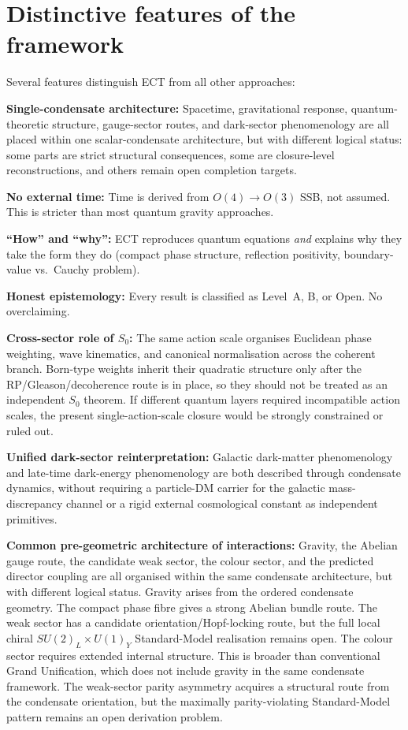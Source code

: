 \documentclass[11pt,a4paper]{article}
\begin{document}
\section{Distinctive features of the framework}

Several features distinguish ECT from all other approaches:

\textbf{Single-condensate architecture:} Spacetime, gravitational response, quantum-theoretic structure, gauge-sector routes, and dark-sector phenomenology are all placed within one scalar-condensate architecture, but with different logical status: some parts are strict structural consequences, some are closure-level reconstructions, and others remain open completion targets.

\textbf{No external time:} Time is derived from $O(4) \to O(3)$ SSB, not assumed. This is stricter than most quantum gravity approaches.

\textbf{``How'' and ``why'':} ECT reproduces quantum equations \emph{and} explains why they take the form they do (compact phase structure, reflection positivity, boundary-value vs.\ Cauchy problem).

\textbf{Honest epistemology:} Every result is classified as Level~A, B, or Open. No overclaiming.

\textbf{Cross-sector role of $S_0$:} The same action scale organises Euclidean phase weighting, wave kinematics, and canonical normalisation across the coherent branch. Born-type weights inherit their quadratic structure only after the RP/Gleason/decoherence route is in place, so they should not be treated as an independent $S_0$ theorem. If different quantum layers required incompatible action scales, the present single-action-scale closure would be strongly constrained or ruled out.

\textbf{Unified dark-sector reinterpretation:} Galactic dark-matter phenomenology and late-time dark-energy phenomenology are both described through condensate dynamics, without requiring a particle-DM carrier for the galactic mass-discrepancy channel or a rigid external cosmological constant as independent primitives.

\textbf{Common pre-geometric architecture of interactions:} Gravity, the Abelian gauge route, the candidate weak sector, the colour sector, and the predicted director coupling are all organised within the same condensate architecture, but with different logical status. Gravity arises from the ordered condensate geometry. The compact phase fibre gives a strong Abelian bundle route. The weak sector has a candidate orientation/Hopf-locking route, but the full local chiral $SU(2)_L\times U(1)_Y$ Standard-Model realisation remains open. The colour sector requires extended internal structure. This is broader than conventional Grand Unification, which does not include gravity in the same condensate framework. The weak-sector parity asymmetry acquires a structural route from the condensate orientation, but the maximally parity-violating Standard-Model pattern remains an open derivation problem.
\end{document}
